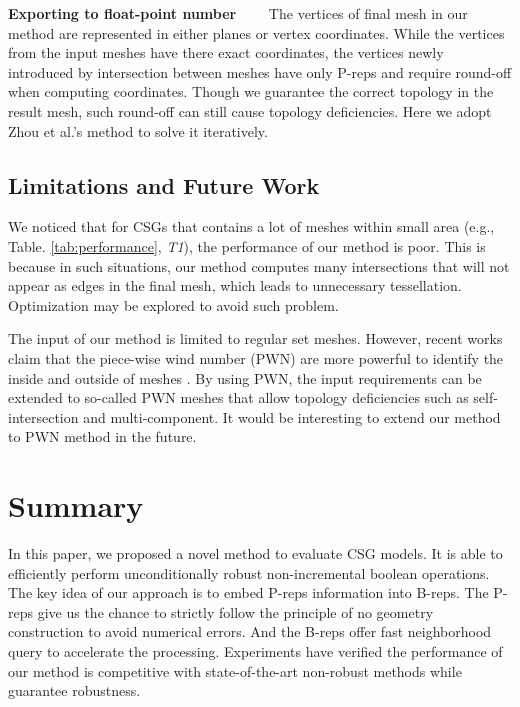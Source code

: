 \documentclass[10pt,journal,compsoc]{IEEEtran}
\begin{document}
\vspace{0.5em}
\noindent\textbf{Exporting to float-point number}~~~~
The vertices of final mesh in our method are represented in either planes or vertex coordinates. While the vertices from the input meshes have there exact coordinates, the vertices newly introduced by intersection between meshes have only P-reps and require round-off when computing coordinates. Though we guarantee the correct topology in the result mesh, such round-off can still cause topology deficiencies. Here we adopt Zhou et al.'s method \cite{zhou2016mesh} to solve it iteratively.

\subsection{Limitations and Future Work}

We noticed that for CSGs that contains a lot of meshes within small area (e.g., Table. \ref{tab:performance}, \emph{T1}), the performance of our method is poor. This is because in such situations, our method computes many intersections that will not appear as edges in the final mesh, which leads to unnecessary tessellation. Optimization may be explored to avoid such problem.

The input of our method is limited to regular set meshes. However, recent works claim that the piece-wise wind number (PWN) are more powerful to identify the inside and outside of meshes \cite{zhou2016mesh}.  By using PWN, the input requirements can be extended to so-called PWN meshes that allow topology deficiencies such as self-intersection and multi-component. It would be interesting to extend our method to PWN method in the future.


\section{Summary}

In this paper, we proposed a novel method to evaluate CSG models. It is able to efficiently perform unconditionally robust non-incremental boolean operations. The key idea of our approach is to embed P-reps information into B-reps. The P-reps give us the chance to strictly follow the principle of no geometry construction to avoid numerical errors. And the B-reps offer fast neighborhood query to accelerate the processing. Experiments have verified the performance of our method is competitive with state-of-the-art non-robust methods while guarantee robustness.
\end{document}
